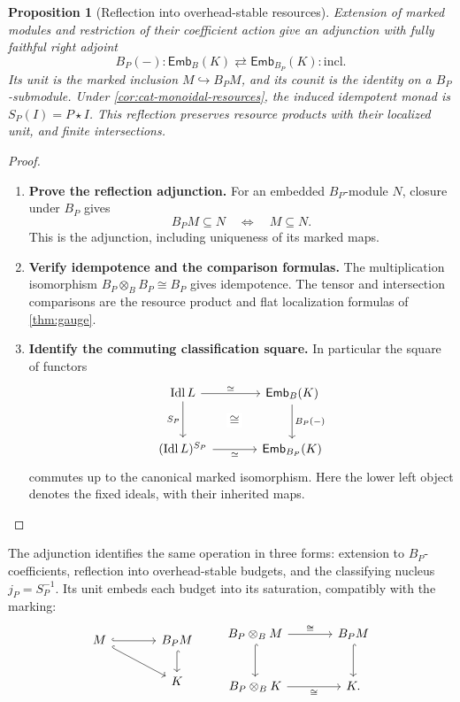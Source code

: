\documentclass[11pt,a4paper]{article}
\numberwithin{algorithm}{section}
\numberwithin{equation}{section}
\newtheorem{proposition}[proposition]{Proposition}
\theoremstyle{definition}
\theoremstyle{remark}
\theoremstyle{plain}
\newcommand{\Idl}{\operatorname{Idl}}
\newcommand{\incl}{\hookrightarrow}
\newcommand{\Emb}{\mathsf{Emb}}
\theoremstyle{definition}
\theoremstyle{plain}
\begin{document}
\begin{proposition}[Reflection into overhead-stable resources]
\label{prop:cat-gauge-reflection}
Extension of marked modules and restriction of their coefficient action
give an adjunction with fully faithful right adjoint
\[
 B_P(-):\Emb_B(K)\rightleftarrows\Emb_{B_P}(K):\mathrm{incl}.
\]
Its unit is the marked inclusion $M\incl B_PM$, and its counit is
the identity on a $B_P$-submodule.  Under
\cref{cor:cat-monoidal-resources}, the induced idempotent monad
is $S_P(I)=P\star I$.  This reflection preserves resource products
with their localized unit, and finite intersections.
\end{proposition}
\begin{proof}\leavevmode
\begin{enumerate}[leftmargin=*,align=left]
\item \textbf{Prove the reflection adjunction.}
For an embedded $B_P$-module $N$, closure under $B_P$ gives
\[
 B_PM\subseteq N\quad\Longleftrightarrow\quad M\subseteq N.
\]
This is the adjunction, including uniqueness of its marked maps.

\item \textbf{Verify idempotence and the comparison formulas.}
The multiplication isomorphism $B_P\otimes_BB_P\cong B_P$ gives
idempotence.  The tensor and intersection comparisons are the
resource product and flat localization formulas of \cref{thm:gauge}.

\item \textbf{Identify the commuting classification square.}
In particular the square of functors
\[
\begin{tikzcd}[column sep=large,row sep=large]
 \Idl L \arrow[dr,phantom,"\cong" description] \arrow[r,"{\simeq}"] \arrow[d,"{S_P}"']
   & \Emb_B(K) \arrow[d,"{B_P(-)}"]\\
 (\Idl L)^{S_P} \arrow[r,"{\simeq}"']
   & \Emb_{B_P}(K)
\end{tikzcd}
\]
commutes up to the canonical marked isomorphism.  Here the lower
left object denotes the fixed ideals, with their inherited maps.
\end{enumerate}
\end{proof}
The adjunction identifies the same operation in three forms:
extension to $B_P$-coefficients, reflection into overhead-stable budgets,
and the classifying nucleus $j_P=S_P^{-1}$. Its unit embeds each
budget into its saturation, compatibly with the marking:
\[
\begin{tikzcd}[column sep=large]
 M \arrow[r,hook] \arrow[dr,hook]
   & B_PM \arrow[d,hook]\\
 & K
\end{tikzcd}
\qquad
\begin{tikzcd}[column sep=large,row sep=large]
 B_P\otimes_BM \arrow[r,"{\cong}"] \arrow[d,hook]
   & B_PM \arrow[d,hook]\\
 B_P\otimes_BK \arrow[r,"{\cong}"'] & K .
\end{tikzcd}
\]
\end{document}
